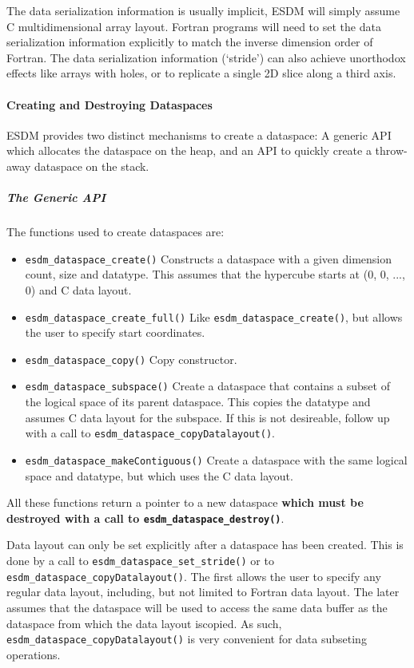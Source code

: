 The data serialization information is usually implicit, ESDM will simply
assume C multidimensional array layout. Fortran programs will need to
set the data serialization information explicitly to match the inverse
dimension order of Fortran. The data serialization information
(`stride') can also achieve unorthodox effects like arrays with holes,
or to replicate a single 2D slice along a third axis.

\paragraph{Creating and Destroying Dataspaces}

ESDM provides two distinct mechanisms to create a dataspace: A generic
API which allocates the dataspace on the heap, and an API to quickly
create a throw-away dataspace on the stack.

\subparagraph{The Generic API}

The functions used to create dataspaces are:

\begin{itemize}
  \item \lstinline|esdm_dataspace_create()|
    Constructs a dataspace with a given dimension count, size and datatype. 
    This assumes that the hypercube starts at (0, 0, ..., 0) and C data layout.
  \item \lstinline|esdm_dataspace_create_full()|
    Like \lstinline|esdm_dataspace_create()|, but allows the user to specify start coordinates.
  \item \lstinline|esdm_dataspace_copy()|
    Copy constructor.
  \item \lstinline|esdm_dataspace_subspace()|
    Create a dataspace that contains a subset of the logical space of its parent dataspace. 
    This copies the datatype and assumes C data layout for the subspace. 
    If this is not desireable, follow up with a call to \lstinline|esdm_dataspace_copyDatalayout()|.
  \item \lstinline|esdm_dataspace_makeContiguous()|
    Create a dataspace with the same logical space and datatype, but which uses the C data layout.
\end{itemize}

All these functions return a pointer to a new dataspace \textbf{which must be destroyed with a call to \lstinline|esdm_dataspace_destroy()|}.

Data layout can only be set explicitly after a dataspace has been created. 
This is done by a call to \lstinline|esdm_dataspace_set_stride()| or to \lstinline|esdm_dataspace_copyDatalayout()|. 
The first allows the user to specify any regular data layout, including, but not limited to Fortran data layout. 
The later assumes that the dataspace will be used to access the same data buffer as the dataspace from which the data layout iscopied. 
As such, \lstinline|esdm_dataspace_copyDatalayout()| is very convenient for data subseting operations.

